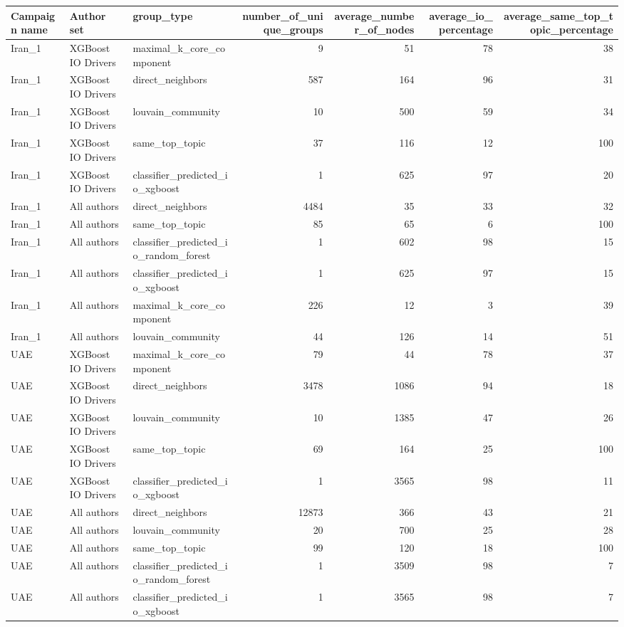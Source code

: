 \begin{tabular}{lllrrrr}
\toprule
Campaign name & Author set & group\_type & number\_of\_unique\_groups & average\_number\_of\_nodes & average\_io\_percentage & average\_same\_top\_topic\_percentage \\
\midrule
Iran\_1 & XGBoost IO Drivers & maximal\_k\_core\_component & 9 & 51 & 78 & 38 \\
Iran\_1 & XGBoost IO Drivers & direct\_neighbors & 587 & 164 & 96 & 31 \\
Iran\_1 & XGBoost IO Drivers & louvain\_community & 10 & 500 & 59 & 34 \\
Iran\_1 & XGBoost IO Drivers & same\_top\_topic & 37 & 116 & 12 & 100 \\
Iran\_1 & XGBoost IO Drivers & classifier\_predicted\_io\_xgboost & 1 & 625 & 97 & 20 \\
Iran\_1 & All authors & direct\_neighbors & 4484 & 35 & 33 & 32 \\
Iran\_1 & All authors & same\_top\_topic & 85 & 65 & 6 & 100 \\
Iran\_1 & All authors & classifier\_predicted\_io\_random\_forest & 1 & 602 & 98 & 15 \\
Iran\_1 & All authors & classifier\_predicted\_io\_xgboost & 1 & 625 & 97 & 15 \\
Iran\_1 & All authors & maximal\_k\_core\_component & 226 & 12 & 3 & 39 \\
Iran\_1 & All authors & louvain\_community & 44 & 126 & 14 & 51 \\
UAE & XGBoost IO Drivers & maximal\_k\_core\_component & 79 & 44 & 78 & 37 \\
UAE & XGBoost IO Drivers & direct\_neighbors & 3478 & 1086 & 94 & 18 \\
UAE & XGBoost IO Drivers & louvain\_community & 10 & 1385 & 47 & 26 \\
UAE & XGBoost IO Drivers & same\_top\_topic & 69 & 164 & 25 & 100 \\
UAE & XGBoost IO Drivers & classifier\_predicted\_io\_xgboost & 1 & 3565 & 98 & 11 \\
UAE & All authors & direct\_neighbors & 12873 & 366 & 43 & 21 \\
UAE & All authors & louvain\_community & 20 & 700 & 25 & 28 \\
UAE & All authors & same\_top\_topic & 99 & 120 & 18 & 100 \\
UAE & All authors & classifier\_predicted\_io\_random\_forest & 1 & 3509 & 98 & 7 \\
UAE & All authors & classifier\_predicted\_io\_xgboost & 1 & 3565 & 98 & 7 \\

\end{tabular}

